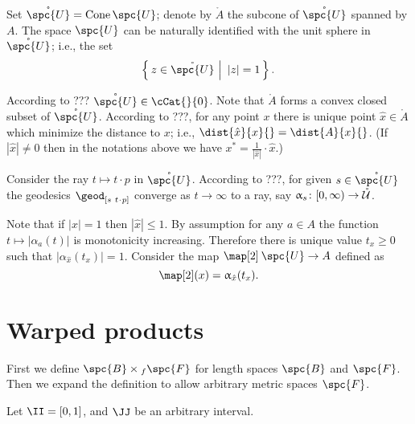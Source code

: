 Set $\mathring{\spc{U}}=\Cone \spc{U}$;
denote by $\mathring{A}$ the subcone of $\mathring{\spc{U}}$ spanned by $A$.
The space $\spc{U}$ can be naturally identified with the unit sphere in $\mathring{\spc{U}}$;
i.e., the set 
\[\set{z\in \mathring{\spc{U}}}{|z|=1}.\]

According to ??? $\mathring{\spc{U}}\in\cCat{}{0}$.
Note that $\mathring{A}$ forms a convex closed subset of $\mathring{\spc{U}}$.
According to ???, for any point $x$ there is unique point $\hat x\in \mathring{A}$
which minimize the distance to $x$;
i.e., $\dist{\hat x}{x}{}=\dist{A}{x}{}$.
(If $|\hat x|\ne0$ then in the notations above we have
$x^*=\tfrac1{|\hat x|}\cdot\hat x$.)

Consider the ray $t\mapsto t\cdot p$ in  $\mathring{\spc{U}}$.
According to ???, %
for given $s\in \mathring{\spc{U}}$
the geodesics $\geod_{[s\ t\cdot p]}$ converge as $t\to\infty$ to a ray, 
say $\alpha_s\:[0,\infty)\to \mathring{\spc{U}}$.



Note that if $|x|=1$ then $|\hat x|\le 1$.
By assumption for any $a\in A$ the function $t\mapsto |\alpha_a(t)|$ is monotonicity increasing.
Therefore there is unique value $t_x\ge 0$ such that
$|\alpha_{\hat x}(t_x)|=1$.
Consider the map $\map[2]\:\spc{U}\to A$
defined as 
\[\map[2](x)=\alpha_{\hat x}(t_x).\]










\section{Warped products}\label{sec:wp-def}
First we define  $\spc{B}\times_f\spc{F}$ for length spaces $\spc{B}$ and $\spc{F}$.  Then we expand the definition to allow arbitrary metric spaces $\spc{F}$.

Let $\II=[0,1]$, and $\JJ$ be an arbitrary interval.

